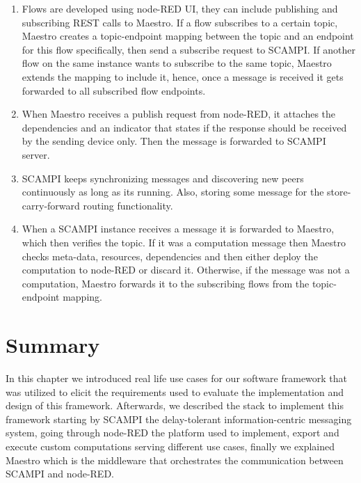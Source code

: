 \begin{enumerate}[label=(\Alph*)]
 
 \item Flows are developed using node-RED UI, they can include publishing and subscribing REST calls to Maestro. If a flow subscribes to a certain topic, Maestro creates  a topic-endpoint mapping between the topic and an endpoint for this flow specifically, then send a subscribe request to SCAMPI. If another flow on the same instance wants to subscribe to the same topic, Maestro extends the mapping to include it, hence, once a message is received it gets forwarded to all subscribed flow endpoints. 

 \item When Maestro receives a publish request from node-RED, it attaches the dependencies and an indicator that states if the response should be received by the sending device only. Then the message is forwarded to SCAMPI server.

 \item SCAMPI keeps synchronizing messages and discovering new peers continuously as long as its running. Also, storing some message for the store-carry-forward routing functionality.

 \item When a SCAMPI instance receives a message it is forwarded to Maestro, which then verifies the topic. If it was a computation message then Maestro checks meta-data, resources, dependencies and then either deploy the computation to node-RED or discard it. Otherwise, if the message was not a computation, Maestro forwards it to the subscribing flows from the topic-endpoint mapping. 

\end{enumerate}

\section{Summary}

In this chapter we introduced real life use cases for our software framework that was utilized to elicit the requirements used to evaluate the implementation and design of this framework. Afterwards, we described the stack  to implement this framework starting by SCAMPI the  delay-tolerant information-centric messaging system, going through node-RED the platform used to implement, export and execute custom computations serving different use cases, finally we explained Maestro which is the middleware that orchestrates the communication between SCAMPI and node-RED.